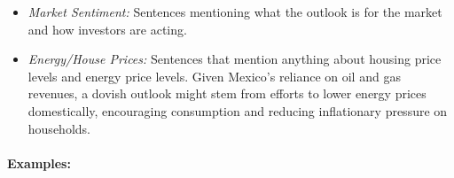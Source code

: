 \begin{itemize}

    \item \textit{Market Sentiment:}  
    Sentences mentioning what the outlook is for the market and how investors are acting.

    \item \textit{Energy/House Prices:}  
    Sentences that mention anything about housing price levels and energy price levels. Given Mexico’s reliance on oil and gas revenues, a dovish outlook might stem from efforts to lower energy prices domestically, encouraging consumption and reducing inflationary pressure on households.


\end{itemize}


\paragraph{Examples:}

